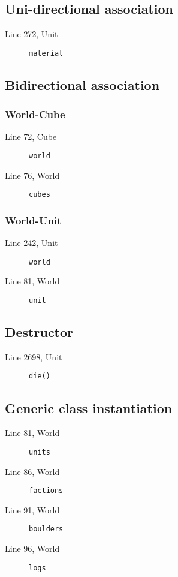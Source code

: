 \documentclass[]{article}
\begin{document}
\subsection{Uni-directional association}
	\begin{description}
		\item[Line 272, Unit] \texttt{material}
	\end{description}

\subsection{Bidirectional association}
	\subsubsection{World-Cube}
	\begin{description}
		\item[Line 72, Cube] \texttt{world}
		\item[Line 76, World] \texttt{cubes}
	\end{description}
	\subsubsection{World-Unit}
	\begin{description}
		\item[Line 242, Unit] \texttt{world}
		\item[Line 81, World] \texttt{unit}
	\end{description}
	
\subsection{Destructor}
	\begin{description}
		\item[Line 2698, Unit] \texttt{die()}
	\end{description}
	
\subsection{Generic class instantiation}
	\begin{description}
		\item[Line 81, World] \texttt{units}
		\item[Line 86, World] \texttt{factions}
		\item[Line 91, World] \texttt{boulders}
		\item[Line 96, World] \texttt{logs}		
	\end{description}
	
\end{document}
